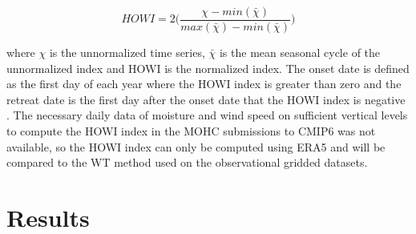  \begin{equation}
 HOWI = 2 \bigg(\frac{\chi - min(\bar{\chi})}{max(\bar{\chi})-min(\bar{\chi})} \bigg)
 \end{equation}

 \noindent where $\chi$ is the unnormalized time series, $\bar{\chi}$ is the mean seasonal cycle of the unnormalized index and HOWI is the normalized index. The onset date is defined as the first day of each year where the HOWI index is greater than zero and the retreat date is the first day after the onset date that the HOWI index is negative \citep{fasullo2003,Sahana_2015}.
 The necessary daily data of moisture and wind speed on sufficient vertical levels to compute the HOWI index in the MOHC submissions to CMIP6 was not available, so the HOWI index can only be computed using ERA5 and will be compared to the WT method used on the observational gridded datasets.

\section{Results}

